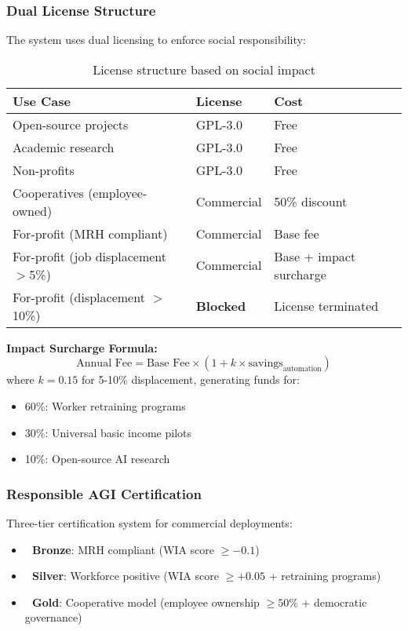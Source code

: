 \documentclass[11pt]{article}
\begin{document}
\subsubsection{Dual License Structure}

The system uses dual licensing to enforce social responsibility:

\begin{table}[H]
\centering
\begin{tabular}{@{}lll@{}}
\toprule
\textbf{Use Case} & \textbf{License} & \textbf{Cost} \\ \midrule
Open-source projects & GPL-3.0 & Free \\
Academic research & GPL-3.0 & Free \\
Non-profits & GPL-3.0 & Free \\
Cooperatives (employee-owned) & Commercial & 50\% discount \\
For-profit (MRH compliant) & Commercial & Base fee \\
For-profit (job displacement $>$5\%) & Commercial & Base + impact surcharge \\
For-profit (displacement $>$10\%) & \textbf{Blocked} & License terminated \\ \bottomrule
\end{tabular}
\caption{License structure based on social impact}
\end{table}

\textbf{Impact Surcharge Formula:}
\[
\text{Annual Fee} = \text{Base Fee} \times (1 + k \times \text{savings}_{\text{automation}})
\]
where $k = 0.15$ for 5-10\% displacement, generating funds for:
\begin{itemize}
    \item 60\%: Worker retraining programs
    \item 30\%: Universal basic income pilots
    \item 10\%: Open-source AI research
\end{itemize}

\subsubsection{Responsible AGI Certification}

Three-tier certification system for commercial deployments:

\begin{itemize}
    \item \textbf{🥉 Bronze}: MRH compliant (WIA score $\geq -0.1$)
    \item \textbf{🥈 Silver}: Workforce positive (WIA score $\geq +0.05$ + retraining programs)
    \item \textbf{🥇 Gold}: Cooperative model (employee ownership $\geq 50\%$ + democratic governance)
\end{itemize}
\end{document}
